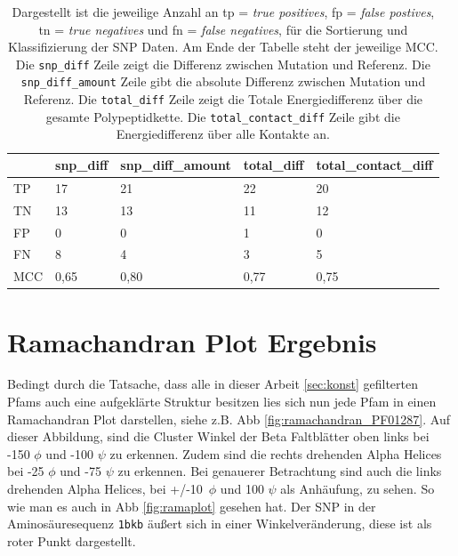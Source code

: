 \begin{table}[]
    \centering
    \caption{Dargestellt ist die jeweilige Anzahl an tp = \emph{true positives}, fp = \emph{false postives}, tn = \emph{true negatives} und fn = \emph{false negatives}, für die Sortierung und Klassifizierung der \ac{SNP} Daten. Am Ende der Tabelle steht der jeweilige \acf{MCC}. Die \texttt{snp\_diff} Zeile zeigt die Differenz zwischen Mutation und Referenz. Die \texttt{snp\_diff\_amount} Zeile gibt die absolute Differenz zwischen Mutation und Referenz. Die \texttt{total\_diff} Zeile zeigt die Totale Energiedifferenz über die gesamte Polypeptidkette. Die \texttt{total\_contact\_diff} Zeile gibt die Energiedifferenz über alle Kontakte an.}
    \label{tab:mcc_table}
    \begin{tabular}{l|l|l|l|l|}
        \cline{2-5}
         & snp\_diff & snp\_diff\_amount & total\_diff & total\_contact\_diff \\ \hline
        \multicolumn{1}{|l|}{TP} & 17 & 21 & 22 & 20 \\ \hline
        \multicolumn{1}{|l|}{TN} & 13 & 13 & 11 & 12 \\ \hline
        \multicolumn{1}{|l|}{FP} & 0 & 0 & 1 & 0 \\ \hline
        \multicolumn{1}{|l|}{FN} & 8 & 4 & 3 & 5 \\ \hline
        \multicolumn{1}{|l|}{MCC} & \cellcolor[HTML]{FFFFC7}0,65 & \cellcolor[HTML]{9AFF99}0,80 & \cellcolor[HTML]{CBFFCB}0,77 & \cellcolor[HTML]{E2FFE2}0,75 \\ \hline
    \end{tabular}
\end{table}



\section{Ramachandran Plot Ergebnis}
Bedingt durch die Tatsache, dass alle in dieser Arbeit \ref{sec:konst} gefilterten \ac{Pfams} auch eine aufgeklärte Struktur besitzen lies sich nun jede \ac{Pfam} in einen Ramachandran Plot darstellen, siehe z.B. \ac{Abb} \ref{fig:ramachandran_PF01287}. Auf dieser Abbildung, sind die Cluster Winkel der Beta Faltblätter oben links bei -150 $\phi$ und -100 $\psi$ zu erkennen. Zudem sind die rechts drehenden Alpha Helices bei -25 $\phi$ und -75 $\psi$ zu erkennen. Bei genauerer Betrachtung sind auch die links drehenden Alpha Helices, bei +/-10\ $\phi$ und 100 $\psi$ als Anhäufung, zu sehen. So wie man es auch in \ac{Abb} \ref{fig:ramaplot} gesehen hat. Der \ac{SNP} in der Aminosäuresequenz \texttt{1bkb} äußert sich in einer Winkelveränderung, diese ist als roter Punkt dargestellt.

